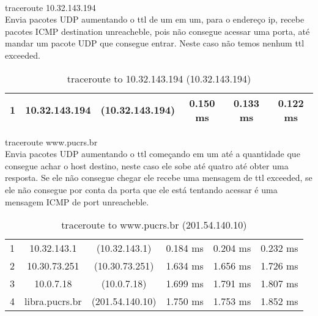 \documentclass[12pt]{article}
\begin{document}
         
        
         \\
        traceroute 10.32.143.194 \\ 
        Envia pacotes UDP aumentando o ttl de um em um, para o endereço ip, recebe pacotes ICMP destination unreacheble, pois não consegue acessar uma porta, até mandar um pacote UDP que consegue entrar. Neste caso não temos nenhum ttl exceeded. 
   
    \begin{table}[ht]
    \centering
    \caption{traceroute to 10.32.143.194 (10.32.143.194)}
    \vspace{0.5cm}
    \begin{tabular}{c|c|c|c|c|c}
    \hline   
    \hline   
    1 & 10.32.143.194 & (10.32.143.194) & 0.150 ms & 0.133 ms & 0.122 ms  \\
    \hline   
    \hline   
    \end{tabular}
    \end{table}
    
        traceroute www.pucrs.br\\
        Envia pacotes UDP aumentando o ttl começando em um até a quantidade que consegue achar o host destino, neste caso ele sobe até quatro até obter uma resposta. Se ele não consegue chegar ele recebe uma mensagem de ttl exceeded, se ele não consegue por conta da porta que ele está tentando acessar é uma mensagem ICMP de port unreacheble.
        
            \begin{table}[ht]
    \centering
    \caption{traceroute to www.pucrs.br (201.54.140.10)}
    \vspace{0.5cm}
    \begin{tabular}{c|c|c|c|c|c}
    \hline   
    \hline   
 1 & 10.32.143.1 & (10.32.143.1) &  0.184 ms & 0.204 ms&  0.232 ms\\
 2 & 10.30.73.251 & (10.30.73.251) & 1.634 ms & 1.656 ms & 1.726 ms\\
 3 & 10.0.7.18 & (10.0.7.18) & 1.699 ms & 1.791 ms & 1.807 ms\\
 4 & libra.pucrs.br & (201.54.140.10) &  1.750 ms & 1.753 ms&  1.852 ms  \\
    \hline   
    \hline   
    \end{tabular}
    \end{table}
       \newpage{}
    
\end{document}
